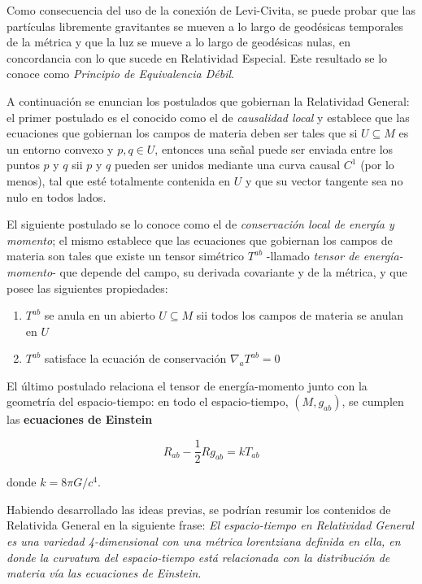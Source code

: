 Como consecuencia del uso de la conexión de Levi-Civita, se puede probar que las partículas libremente gravitantes se mueven a lo largo de geodésicas temporales de la métrica y que la luz se mueve a lo largo de geodésicas nulas, en concordancia con lo que sucede en Relatividad Especial. Este resultado se lo conoce como \textit{Principio de Equivalencia Débil}. 

A continuación se enuncian los postulados que gobiernan la Relatividad General: el primer postulado es el conocido como el de \textit{causalidad local} y establece que las ecuaciones que gobiernan los campos de materia deben ser tales que si $U\subseteq M$ es un entorno convexo y $p,q\in U$, entonces una señal puede ser enviada entre los puntos $p$ y $q$ sii $p$ y $q$ pueden ser unidos mediante una curva causal $C^1$ (por lo menos), tal que esté totalmente contenida en $U$ y que su vector tangente sea no nulo en todos lados. 

El siguiente postulado se lo conoce como el de \textit{conservación local de energía y momento}; el mismo establece que las ecuaciones que gobiernan los campos de materia son tales que existe un tensor simétrico $T^{ab}$ -llamado \textit{tensor de energía-momento}- que depende del campo, su derivada covariante y de la métrica, y que posee las siguientes propiedades:

\begin{enumerate}[{(1)}]
    \item $T^{ab}$ se anula en un abierto $U\subseteq M$ sii todos los campos de materia se anulan en $U$
    \item $T^{ab}$ satisface la ecuación de conservación $\nabla_aT^{ab}=0$
\end{enumerate}

El último postulado relaciona el tensor de energía-momento junto con la geometría del espacio-tiempo: en todo el espacio-tiempo, $(M,g_{ab})$, se cumplen las \textbf{ecuaciones de Einstein}

\begin{equation*}
    R_{ab}-\frac{1}{2}Rg_{ab}=kT_{ab}
\end{equation*}

donde $k=8\pi G/c^4$. 

Habiendo desarrollado las ideas previas, se podrían resumir los contenidos de Relativida General en la siguiente frase: \textit{El espacio-tiempo en Relatividad General es una variedad 4-dimensional con una métrica lorentziana definida en ella, en donde la curvatura del espacio-tiempo está relacionada con la distribución de materia vía las ecuaciones de Einstein}.





